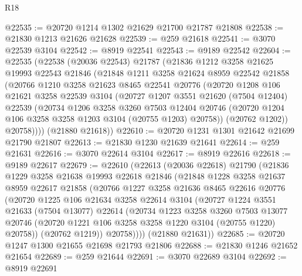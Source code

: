 \begin{lexlean}{R18}
\begin{coremodule}
@22535 := @20720 @1214 @1302 @21629 @21700 @21787 @21808
@22538 := @21830 @1213 @21626 @21628
@22539 := @259 @21618
@22541 := @3070 @22539 @3104
@22542 := @8919 @22541
@22543 := @9189 @22542
@22604 := @22535
    (@22538
      (@20036 @22543)
      @21787
      (@21836
        @1212
        @3258
        @21625
        @19993
        @22543
        @21846
        (@21848
          @1211
          @3258
          @21624
          @8959
          @22542
          @21858
          (@20766
            @1210
            @3258
            @21623
            @8465
            @22541
            @20776
            (@20720
              @1208
              @106
              @21621
              @3258
              @22539
              @3104
              (@20727
                @1207
                @3551
                @21620
                (@7504 @12404)
                @22539
                (@20734
                  @1206
                  @3258
                  @3260
                  @7503
                  @12404
                  @20746
                  (@20720 @1204 @106 @3258 @3258 @1203 @3104 (@20755 @1203) @20758))
                (@20762 @1202))
              @20758))))
      (@21880 @21618))
@22610 := @20720 @1231 @1301 @21642 @21699 @21790 @21807
@22613 := @21830 @1230 @21639 @21641
@22614 := @259 @21631
@22616 := @3070 @22614 @3104
@22617 := @8919 @22616
@22618 := @9189 @22617
@22679 := @22610
    (@22613
      (@20036 @22618)
      @21790
      (@21836
        @1229
        @3258
        @21638
        @19993
        @22618
        @21846
        (@21848
          @1228
          @3258
          @21637
          @8959
          @22617
          @21858
          (@20766
            @1227
            @3258
            @21636
            @8465
            @22616
            @20776
            (@20720
              @1225
              @106
              @21634
              @3258
              @22614
              @3104
              (@20727
                @1224
                @3551
                @21633
                (@7504 @13077)
                @22614
                (@20734
                  @1223
                  @3258
                  @3260
                  @7503
                  @13077
                  @20746
                  (@20720 @1221 @106 @3258 @3258 @1220 @3104 (@20755 @1220) @20758))
                (@20762 @1219))
              @20758))))
      (@21880 @21631))
@22685 := @20720 @1247 @1300 @21655 @21698 @21793 @21806
@22688 := @21830 @1246 @21652 @21654
@22689 := @259 @21644
@22691 := @3070 @22689 @3104
@22692 := @8919 @22691

\end{coremodule}
\end{lexlean}
